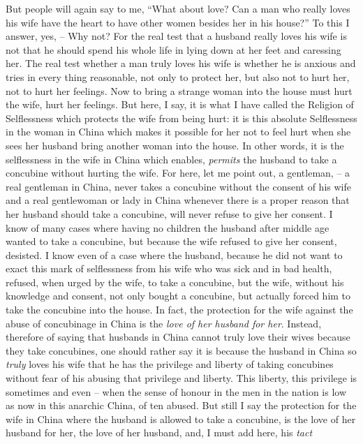 But people will again say to me,
``What about love?
Can a man who really loves his wife have the heart to have other women besides her in his house?''
To this I answer, yes,
--  Why not? For the real test that a husband really loves his wife is not that he should spend his whole life in lying down at her feet and caressing her.
The real test whether a man truly loves his wife is whether he is anxious
and tries in every thing reasonable, not only to protect her, but also not to hurt her,
not to hurt her feelings.
Now to bring a strange woman into the house must hurt the wife, hurt her feelings.
But here, I say, it is what I have called the Religion of Selflessness which protects the wife from being hurt:
it is this absolute Selflessness in the woman in China which makes it possible for her not to feel hurt when she sees her husband bring another woman into the house.
In other words, it is the selflessness in the wife in China which enables,
\emph{permits} the husband to take a concubine without hurting the wife.
For here, let me point out, a gentleman,
-- a real gentleman in China, never takes a concubine without the consent of his wife and a real gentlewoman or lady in China whenever there is a proper reason that her husband should take a concubine, will never refuse to give her consent.
I know of many cases where having no children the husband after middle age wanted to take a concubine, but because the wife refused to give her consent, desisted.
I know even of a case where the husband, because he did not want to exact this mark of selflessness from his wife who was sick and in bad health, refused, when urged by the wife,
to take a concubine, but the wife, without his knowledge and consent, not only bought a concubine, but actually forced him to take the concubine into the house.
In fact, the protection for the wife against the abuse of concubinage in China
is the \emph{love of her husband for her}.
Instead, therefore of saying that husbands in China cannot truly love their wives because they take concubines,
one should rather say it is because the husband in China so \emph{truly} loves his wife that he has the privilege and liberty of taking concubines without fear of his abusing that privilege and liberty.
This liberty, this privilege is sometimes and even
-- when the sense of honour in the men in the nation is low as now in this anarchic China, of ten abused.
But still I say the protection for the wife in China where the husband is allowed to take a concubine,
is the love of her husband for her, the love of her husband,
and, I must add here, his \emph{tact}
